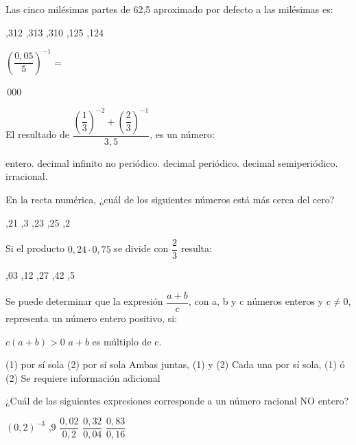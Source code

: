 \documentclass[pagina vacia]{srs}
\begin{document}
\begin{preguntas}[after-item-skip=1cm]
\pregunta Las cinco milésimas partes de 62,5 aproximado por defecto a las milésimas es:
\begin{vertical}
,312
,313
,310
,125
,124
\end{vertical}

\pregunta \( \left(\dfrac{0,05}{5}\right)^{-1} = \)
\begin{vertical}
\,000
\end{vertical}

\pregunta El resultado de \( \dfrac{\left(\dfrac{1}{3}\right)^{-2} + \left(\dfrac{2}{3}\right)^{-1}}{3,5} \), es un número:
\begin{vertical}
\alternativa entero.
\alternativa decimal infinito no periódico.
\alternativa decimal periódico.
\alternativa decimal semiperiódico.
\alternativa irracional.
\end{vertical}

\pregunta En la recta numérica, ¿cuál de los siguientes números está más cerca del cero?
\begin{vertical}
,21
,3
,23
,25
,2
\end{vertical}

\pregunta Si el producto \(0,24 \cdot 0,75\) se divide con \(\dfrac{2}{3}\) resulta:
\begin{vertical}
,03
,12
,27
,42
,5
\end{vertical}

\pregunta Se puede determinar que la expresión \(\dfrac{a+b}{c}\), con a, b y c números enteros y \(c \neq 0\), representa un número entero positivo, si:
\begin{verticaln}
\alternativa \(c\left(a + b\right)>0\)
\alternativa \(a + b\) es múltiplo de c.
\end{verticaln}
\begin{vertical}
\alternativa (1) por sí sola
\alternativa (2) por sí sola
\alternativa Ambas juntas, (1) y (2)
\alternativa Cada una por sí sola, (1) ó (2)
\alternativa Se requiere información adicional
\end{vertical}

\pregunta ¿Cuál de las siguientes expresiones corresponde a un número racional NO entero?
\begin{vertical}
\alternativa \( (0,2)^{-3} \)
,9
\alternativa \( \dfrac{0,02}{0,2} \)
\alternativa \( \dfrac{0,32}{0,04} \)
\alternativa \( \dfrac{0,83}{0,16} \)
\end{vertical}


\end{preguntas}
\end{document}
